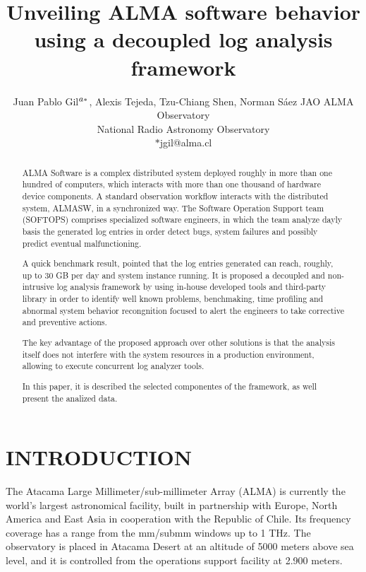 \documentclass[]{spie}  %
\title{Unveiling ALMA software behavior using a decoupled log analysis framework}
\author{Juan Pablo Gil$\supit{a}^{*}$, 
Alexis Tejeda\supit{b}, 
Tzu-Chiang Shen\supit{a}, 
Norman S\'aez\supit{a}
\skiplinehalf
\supit{a}JAO ALMA Observatory\\
\supit{b}National Radio Astronomy Observatory\\ $*$jgil@alma.cl
}
\begin{document}
 
  \maketitle 

\begin{abstract}
ALMA Software is a complex distributed system deployed roughly in more than one
hundred of computers, which interacts with more than one thousand of hardware
device components. A standard observation workflow interacts with the
distributed system, ALMASW, in a synchronized way. The Software Operation
Support team (SOFTOPS) comprises specialized software engineers, in which the 
team analyze dayly basis the generated log entries in order detect bugs, system 
failures and possibly predict eventual malfunctioning. 

A quick benchmark result, pointed that the log entries generated can reach, 
roughly, up to 30 GB per day and system instance running. It is proposed a 
decoupled and non-intrusive log analysis framework by using in-house developed 
tools and third-party library in order to identify well known problems, 
benchmaking, time profiling and
abnormal system behavior recongnition focused to alert the engineers to take 
corrective and preventive actions.

The key advantage of the proposed approach over other solutions is that the 
analysis itself does not interfere with the system resources in a production 
environment, allowing to execute concurrent log analyzer tools. 

In this paper, it is described the selected componentes of the framework, as 
well present the analized data.
\end{abstract}



\renewcommand{\thefootnote}{\arabic{footnote}}

\section{INTRODUCTION}\label{sec:intro}  %
The Atacama Large Millimeter/sub-millimeter Array (ALMA) is currently the
world's largest astronomical facility, built in partnership with Europe,
North America and East Asia in cooperation with the Republic of Chile. Its
frequency coverage has a range from the mm/submm windows up to 1 THz. The
observatory is placed in Atacama Desert at an altitude of 5000 meters above
sea level, and it is controlled from the operations support facility at
2.900 meters.
\end{document}
